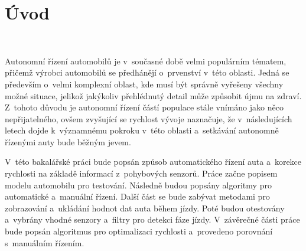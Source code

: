 \chapter*{Úvod}
\label{sec:Introduction}
\

Autonomní řízení automobilů je v~současné době velmi populárním tématem, přičemž
výrobci automobilů se předhánějí o~prvenství v~této oblasti. Jedná se především
o~velmi komplexní oblast, kde musí být správně vyřešeny všechny možné situace, jelikož
jakýkoliv přehlédnutý detail může způsobit újmu na zdraví. Z~tohoto důvodu je
autonomní řízení částí populace stále vnímáno jako něco  nepřijatelného, ovšem
zvyšující se rychlost vývoje naznačuje, že v~následujících letech dojde k~významnému
pokroku v~této oblasti a~setkávání autonomně řízenými auty bude běžným jevem.

V~této bakalářské práci bude popsán způsob automatického řízení auta a~korekce 
rychlosti na základě informací z~pohybových senzorů. Práce začne popisem modelu 
automobilu pro testování. Následně budou popsány algoritmy pro automatické a~manuální 
řízení. Další část se bude zabývat metodami pro zobrazování a~ukládání hodnot dat auta 
během jízdy. Poté budou otestovány a~vybrány vhodné senzory a~filtry pro detekci fáze 
jízdy. V~závěrečné části práce bude popsán algoritmus pro optimalizaci rychlosti 
a~provedeno porovnání s~manuálním řízením.

\endinput